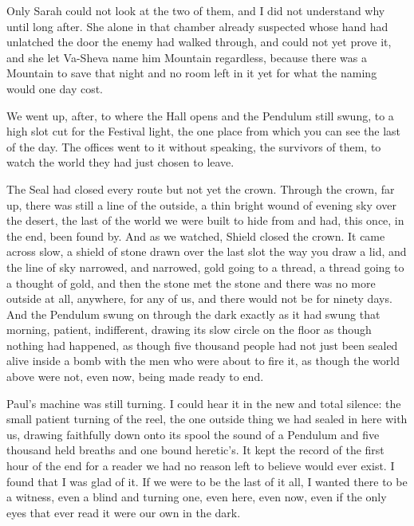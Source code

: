 Only Sarah could not look at the two of them, and I did not understand why until long after. She alone in that chamber already suspected whose hand had unlatched the door the enemy had walked through, and could not yet prove it, and she let Va-Sheva name him Mountain regardless, because there was a Mountain to save that night and no room left in it yet for what the naming would one day cost.\par

\ornament

We went up, after, to where the Hall opens and the Pendulum still swung, to a high slot cut for the Festival light, the one place from which you can see the last of the day. The offices went to it without speaking, the survivors of them, to watch the world they had just chosen to leave.\par

The Seal had closed every route but not yet the crown. Through the crown, far up, there was still a line of the outside, a thin bright wound of evening sky over the desert, the last of the world we were built to hide from and had, this once, in the end, been found by. And as we watched, Shield closed the crown. It came across slow, a shield of stone drawn over the last slot the way you draw a lid, and the line of sky narrowed, and narrowed, gold going to a thread, a thread going to a thought of gold, and then the stone met the stone and there was no more outside at all, anywhere, for any of us, and there would not be for ninety days. And the Pendulum swung on through the dark exactly as it had swung that morning, patient, indifferent, drawing its slow circle on the floor as though nothing had happened, as though five thousand people had not just been sealed alive inside a bomb with the men who were about to fire it, as though the world above were not, even now, being made ready to end.\par

Paul's machine was still turning. I could hear it in the new and total silence: the small patient turning of the reel, the one outside thing we had sealed in here with us, drawing faithfully down onto its spool the sound of a Pendulum and five thousand held breaths and one bound heretic's. It kept the record of the first hour of the end for a reader we had no reason left to believe would ever exist. I found that I was glad of it. If we were to be the last of it all, I wanted there to be a witness, even a blind and turning one, even here, even now, even if the only eyes that ever read it were our own in the dark.\par
